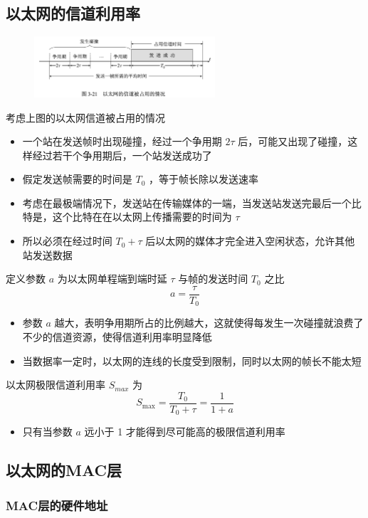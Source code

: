 \documentclass[cs4size,a4paper,10pt]{ctexart}
\begin{document}
	\subsection{以太网的信道利用率}
	\begin{figure}[H]
		\centering
		\includegraphics[width=0.6\textwidth]{img/3.21}
	\end{figure}
	考虑上图的以太网信道被占用的情况
	\begin{itemize}
		\item 一个站在发送帧时出现碰撞，经过一个争用期 $2 \tau$ 后，可能又出现了碰撞，这样经过若干个争用期后，一个站发送成功了
		\item 假定发送帧需要的时间是 $T_0$ ，等于帧长除以发送速率
		\item 考虑在最极端情况下，发送站在传输媒体的一端，当发送站发送完最后一个比特是，这个比特在在以太网上传播需要的时间为 $\tau$ 
		\item 所以必须在经过时间 $T_0 + \tau $ 后以太网的媒体才完全进入空闲状态，允许其他站发送数据
	\end{itemize}

	定义参数 $a$ 为以太网单程端到端时延 $\tau$ 与帧的发送时间 $T_0$ 之比$$a = \frac{\tau}{T_0}$$
	\begin{itemize}
		\item 参数 $a$ 越大，表明争用期所占的比例越大，这就使得每发生一次碰撞就浪费了不少的信道资源，使得信道利用率明显降低
		\item 当数据率一定时，以太网的连线的长度受到限制，同时以太网的帧长不能太短
	\end{itemize}

	以太网极限信道利用率 $S_{max}$ 为
	$$S_{\mathrm{max}} = \frac{T_0}{T_0 + \tau} = \frac{1}{1+a}$$
	\begin{itemize}
		\item 只有当参数 $a$ 远小于 1 才能得到尽可能高的极限信道利用率
	\end{itemize}

	\subsection{以太网的MAC层}

	\subsubsection{MAC层的硬件地址}
\end{document}
